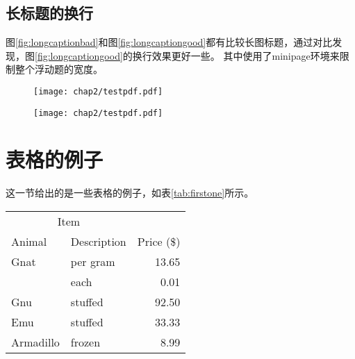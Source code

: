 \subsection{长标题的换行}
\label{sec:longcaption}

图\ref{fig:longcaptionbad}和图\ref{fig:longcaptiongood}都有比较长图标题，通过对比发现，图\ref{fig:longcaptiongood}的换行效果更好一些。
其中使用了minipage环境来限制整个浮动题的宽度。

\begin{figure}[!htp]
 \centering
 \texttt{[image: chap2/testpdf.pdf]}
\end{figure}


  \begin{figure}[!hbp]
    \centering
    \begin{minipage}[b]{0.6\textwidth}
      \captionstyle{\centering}
      \centering
      \texttt{[image: chap2/testpdf.pdf]}
    \end{minipage}     
  \end{figure}

  
\section{表格的例子}
\label{sec:tab}

这一节给出的是一些表格的例子，如表\ref{tab:firstone}所示。

\begin{table}[!hpb]
  \centering
  \begin{tabular}{@{}llr@{}} \toprule
    \multicolumn{2}{c}{Item} \\ \cmidrule(r){1-2}
    Animal & Description & Price (\$)\\ \midrule
    Gnat & per gram & 13.65 \\
    & each & 0.01 \\
    Gnu & stuffed & 92.50 \\
    Emu & stuffed & 33.33 \\
    Armadillo & frozen & 8.99 \\ \bottomrule
  \end{tabular}
\end{table}

